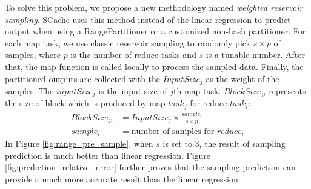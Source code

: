 {To solve this problem, we propose a new methodology named \textit{weighted reservoir sampling}.
SCache uses this method instead of the linear regression to predict output when using a RangePartitioner or a customized non-hash partitioner.
For each map task, we use classic reservoir sampling to randomly pick $s \times p$ of samples, where $p$ is the number of reduce tasks and $s$ is a tunable number. 
After that, the map function is called locally to process the sampled data. 
Finally, the partitioned outputs are collected with the $InputSize_j$ as the weight of the samples.
The $inputSize_j$ is the input size of $j$th map task. 
$BlockSize_{ji}$ represents the size of block which is produced by map $task_j$ for reduce $task_i$:
\begin{equation}
\label{equationsample}
\begin{aligned}
	BlockSize_{ji} &= {{InputSize_j \times \frac{sample_i}{s \times p}}} \\
	sample_i &= \text{number of samples for $reduce_i$}
\end{aligned}
\end{equation}
In Figure \ref{fig:range_pre_sample}, when $s$ is set to $3$, the result of sampling prediction is much better than linear regression. 
Figure \ref{fig:prediction_relative_error} further proves that the sampling prediction can provide a much more accurate result than the linear regression. 


}
